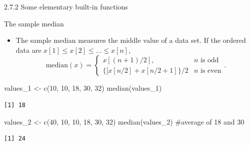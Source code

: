 \documentclass[
  9pt,
  a4paper,
  ignorenonframetext,
  notheorems]{beamer}
\newenvironment{Shaded}{\begin{snugshade}}{\end{snugshade}}
\newcommand{\CommentTok}[1]{\textcolor[rgb]{0.37,0.37,0.37}{#1}}
\newcommand{\DecValTok}[1]{\textcolor[rgb]{0.68,0.00,0.00}{#1}}
\newcommand{\FunctionTok}[1]{\textcolor[rgb]{0.28,0.35,0.67}{#1}}
\newcommand{\NormalTok}[1]{\textcolor[rgb]{0.00,0.23,0.31}{#1}}
\newcommand{\OtherTok}[1]{\textcolor[rgb]{0.00,0.23,0.31}{#1}}
\providecommand{\tightlist}{%
  \setlength{\itemsep}{0pt}\setlength{\parskip}{0pt}}\usepackage{longtable,booktabs,array}
\begin{document}
\begin{frame}[fragile]{2.7.2 Some elementary built-in functions}
\protect\hypertarget{some-elementary-built-in-functions}{}
\begin{block}{The sample median}
\protect\hypertarget{the-sample-median}{}
\begin{itemize}
\tightlist
\item
  The sample median measures the middle value of a data set. If the
  ordered data are \(x[1] \leq x[2] \leq \ldots \leq x[n]\), \[
  \text{median}(x) = 
  \begin{cases}
  x[(n + 1)/2], & n \text{ is odd}\\
  \{[x[n/2] + x[n/2 + 1]\}/2 & n \text{ is even}
  \end{cases}.
  \]
\end{itemize}

\begin{Shaded}
\begin{Highlighting}[]
\NormalTok{values\_1 }\OtherTok{\textless{}{-}} \FunctionTok{c}\NormalTok{(}\DecValTok{10}\NormalTok{, }\DecValTok{10}\NormalTok{, }\DecValTok{18}\NormalTok{, }\DecValTok{30}\NormalTok{, }\DecValTok{32}\NormalTok{)}
\FunctionTok{median}\NormalTok{(values\_1)}
\end{Highlighting}
\end{Shaded}

\begin{verbatim}
[1] 18
\end{verbatim}

\begin{Shaded}
\begin{Highlighting}[]
\NormalTok{values\_2 }\OtherTok{\textless{}{-}} \FunctionTok{c}\NormalTok{(}\DecValTok{40}\NormalTok{, }\DecValTok{10}\NormalTok{, }\DecValTok{10}\NormalTok{, }\DecValTok{18}\NormalTok{, }\DecValTok{30}\NormalTok{, }\DecValTok{32}\NormalTok{)}
\FunctionTok{median}\NormalTok{(values\_2) }\CommentTok{\#average of 18 and 30}
\end{Highlighting}
\end{Shaded}

\begin{verbatim}
[1] 24
\end{verbatim}
\end{block}
\end{frame}
\end{document}
